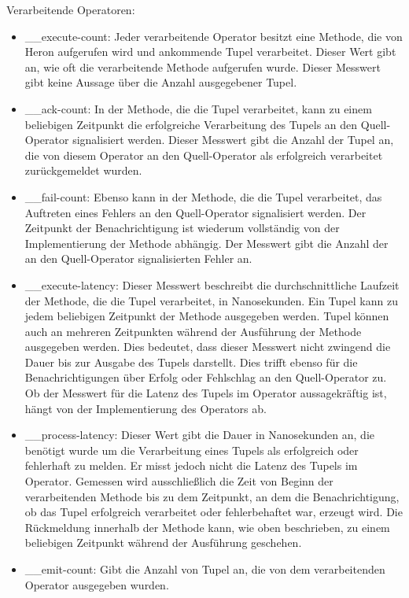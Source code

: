 Verarbeitende Operatoren:

\begin{itemize}
\item{\_\_execute-count: Jeder verarbeitende Operator besitzt eine Methode, die von Heron aufgerufen wird und ankommende Tupel verarbeitet. Dieser Wert gibt an, wie oft die verarbeitende Methode aufgerufen wurde. Dieser Messwert gibt keine Aussage über die Anzahl ausgegebener Tupel.}

\item{\_\_ack-count: In der Methode, die die Tupel verarbeitet, kann zu einem beliebigen Zeitpunkt die erfolgreiche Verarbeitung des Tupels an den Quell-Operator signalisiert werden. Dieser Messwert gibt die Anzahl der Tupel an, die von diesem Operator an den Quell-Operator als erfolgreich verarbeitet zurückgemeldet wurden.}

\item{\_\_fail-count: Ebenso kann in der Methode, die die Tupel verarbeitet, das Auftreten eines Fehlers an den Quell-Operator signalisiert werden. Der Zeitpunkt der Benachrichtigung ist wiederum vollständig von der Implementierung der Methode abhängig. Der Messwert gibt die Anzahl der an den Quell-Operator signalisierten Fehler an.}

\item{\_\_execute-latency: Dieser Messwert beschreibt die durchschnittliche Laufzeit der Methode, die die Tupel verarbeitet, in Nanosekunden. Ein Tupel kann zu jedem beliebigen Zeitpunkt der Methode ausgegeben werden. Tupel können auch an mehreren Zeitpunkten während der Ausführung der Methode ausgegeben werden. Dies bedeutet, dass dieser Messwert nicht zwingend die Dauer bis zur Ausgabe des Tupels darstellt. Dies trifft ebenso für die Benachrichtigungen über Erfolg oder Fehlschlag an den Quell-Operator zu. Ob der Messwert für die Latenz des Tupels im Operator aussagekräftig ist, hängt von der Implementierung des Operators ab.}

\item{\_\_process-latency: Dieser Wert gibt die Dauer in Nanosekunden an, die benötigt wurde um die Verarbeitung eines Tupels als erfolgreich oder fehlerhaft zu melden. Er misst jedoch nicht die Latenz des Tupels im Operator. Gemessen wird ausschließlich die Zeit von Beginn der verarbeitenden Methode bis zu dem Zeitpunkt, an dem die Benachrichtigung, ob das Tupel erfolgreich verarbeitet oder fehlerbehaftet war, erzeugt wird. Die Rückmeldung innerhalb der Methode kann, wie oben beschrieben, zu einem beliebigen Zeitpunkt während der Ausführung geschehen.}

\item{\_\_emit-count: Gibt die Anzahl von Tupel an, die von dem verarbeitenden Operator ausgegeben wurden.}

\end{itemize}

